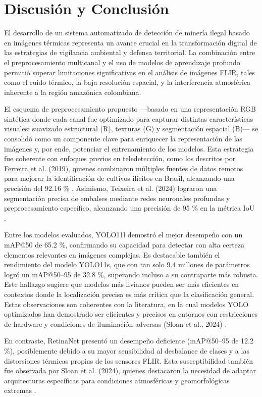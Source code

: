 \section{Discusión y Conclusión}

El desarrollo de un sistema automatizado de detección de minería ilegal basado en imágenes térmicas representa un avance crucial en la transformación digital de las estrategias de vigilancia ambiental y defensa territorial. La combinación entre el preprocesamiento multicanal y el uso de modelos de aprendizaje profundo permitió superar limitaciones significativas en el análisis de imágenes FLIR, tales como el ruido térmico, la baja resolución espacial, y la interferencia atmosférica inherente a la región amazónica colombiana.

El esquema de preprocesamiento propuesto —basado en una representación RGB sintética donde cada canal fue optimizado para capturar distintas características visuales: suavizado estructural (R), texturas (G) y segmentación espacial (B)— se consolidó como un componente clave para enriquecer la representación de las imágenes y, por ende, potenciar el entrenamiento de los modelos. Esta estrategia fue coherente con enfoques previos en teledetección, como los descritos por Ferreira et al. (2019), quienes combinaron múltiples fuentes de datos remotos para mejorar la identificación de cultivos ilícitos en Brasil, alcanzando una precisión del 92.16 \%
. Asimismo, Teixeira et al. (2024) lograron una segmentación precisa de embalses mediante redes neuronales profundas y preprocesamiento específico, alcanzando una precisión de 95 \% en la métrica IoU
.

Entre los modelos evaluados, YOLO11l demostró el mejor desempeño con un mAP@50 de 65.2 \%, confirmando su capacidad para detectar con alta certeza elementos relevantes en imágenes complejas. Es destacable también el rendimiento del modelo YOLO11s, que con tan solo 9.4 millones de parámetros logró un mAP@50–95 de 32.8 \%, superando incluso a su contraparte más robusta. Este hallazgo sugiere que modelos más livianos pueden ser más eficientes en contextos donde la localización precisa es más crítica que la clasificación general. Estas observaciones son coherentes con la literatura, en la cual modelos YOLO optimizados han demostrado ser eficientes y precisos en entornos con restricciones de hardware y condiciones de iluminación adversas (Sloan et al., 2024)
.

En contraste, RetinaNet presentó un desempeño deficiente (mAP@50–95 de 12.2 \%), posiblemente debido a su mayor sensibilidad al desbalance de clases y a las distorsiones térmicas propias de los sensores FLIR. Esta susceptibilidad también fue observada por Sloan et al. (2024), quienes destacaron la necesidad de adaptar arquitecturas específicas para condiciones atmosféricas y geomorfológicas extremas
.

